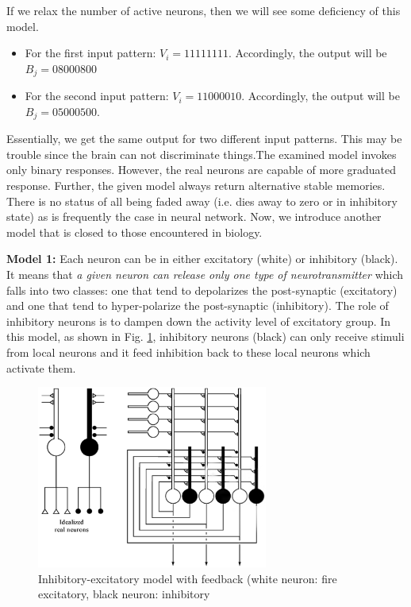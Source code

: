 If we relax the number of active neurons, then we will see some
deficiency of this model.
\begin{itemize}
\item For the first input pattern: $V_i = {1 1 1 1 1 1 1 1 
  }$. Accordingly, the output will be $B_j = {0 8 0 0 0 8 0 0}$ 
\item For the second input pattern: $V_i = {1 1 0 0 0 0 1 0 
  }$. Accordingly, the output will be $B_j = {0 5 0 0 0 5 0 0}$. 
\end{itemize}
Essentially, we get the same output for two different input
patterns. This may be trouble since the brain can not discriminate
things.The examined model invokes only binary responses. However, the
real neurons are capable of more graduated response. Further, the
given model always return alternative stable memories. There is no
status of all being faded away (i.e. dies away to zero or in
inhibitory state) as is frequently the case in neural network. Now, we
introduce another model that is closed to those encountered in
biology. 

{\bf Model 1:} Each neuron can be in either excitatory (white) or
inhibitory (black). It means that
{\it a given neuron can release only one type of neurotransmitter}
which falls into two classes: one that tend to depolarizes the
post-synaptic (excitatory) and one that tend to hyper-polarize the
post-synaptic (inhibitory). The role of inhibitory neurons is to
dampen down the activity level of excitatory group.  In this model, as
shown in Fig. \ref{fig:auto_assoc1}, inhibitory neurons (black) can
only receive stimuli from local neurons and it feed inhibition back to
these local neurons which activate them.
\begin{figure}[htb]
  \centerline{\includegraphics[height=6cm]{./images/inhibitory_excitatory_feedback.eps}}
  \caption{Inhibitory-excitatory model with feedback (white neuron:
    fire excitatory, black neuron: inhibitory}\label{fig:auto_assoc1}
\end{figure}



